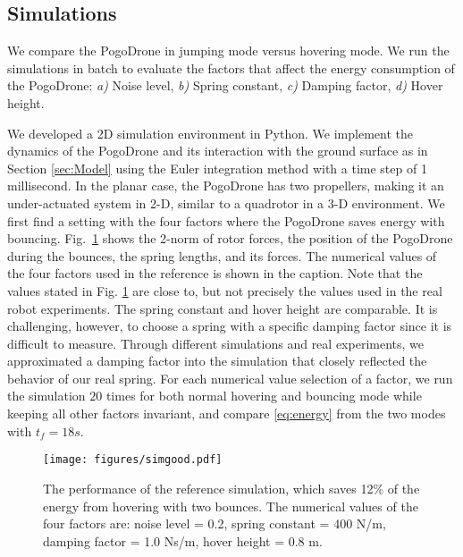 \documentclass[letterpaper,10pt,conference]{ieeeconf}
\begin{document}
\subsection{Simulations}{
\label{sec:simulation}
\noindent
We compare the PogoDrone in jumping mode versus hovering mode. We run the simulations in batch to evaluate the factors that affect the energy consumption of the PogoDrone: \textit{a)} Noise level, \textit{b)} Spring constant, \textit{c)} Damping factor, \textit{d)} Hover height.

We developed a 2D simulation environment in Python. We implement the dynamics of the PogoDrone and its interaction with the ground surface as in Section \ref{sec:Model} using the Euler integration method with a time step of 1 millisecond. In the planar case, the PogoDrone has two propellers, making it an under-actuated system in 2-D, similar to a quadrotor in a 3-D environment. We first find a setting with the four factors where the PogoDrone
saves
energy with bouncing. Fig.~\ref{fig:simgood} shows the 2-norm of rotor forces, the position of the PogoDrone during the bounces, the spring lengths, and its forces. The numerical values of the four factors used in the reference is shown in the caption. Note that the values stated in Fig. \ref{fig:simgood} are close to, but not precisely the values used in the real robot experiments. The spring constant and hover height are comparable. It is challenging, however, to choose a spring with a specific damping factor since it is difficult to measure. Through different simulations and real experiments, we approximated a damping factor into the simulation that closely reflected the behavior of our real spring. For each numerical value selection of a factor, we run the simulation $20$ times for both normal hovering and bouncing mode while keeping all other factors invariant, and compare \eqref{eq:energy} from the two modes with $t_f = 18 s$.
\begin{figure}[t!]
\centering
    \texttt{[image: figures/simgood.pdf]}
    \caption{The performance of the reference simulation, which saves 12\% of the energy from hovering with two bounces. The numerical values of the four factors are: noise level = 0.2, spring constant = 400 N/m, damping factor = 1.0 Ns/m, hover height = 0.8 m.} 
    \label{fig:simgood}
\end{figure}

}
\end{document}
